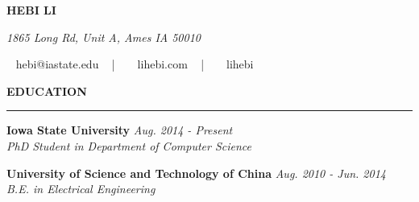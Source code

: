 \documentclass[10pt,letterpaper]{article}
\newenvironment{rSection}[1]{ %
  \sectionskip
  \MakeUppercase{\bf #1} %
  \sectionlineskip
  \hrule %
  \begin{list}{}{ %
      \setlength{\leftmargin}{1.5em} %
    }
  \item[]
}{
  \end{list}
}
\def\namesize{\huge} %
\def\sectionlineskip{\medskip} %
\def\nameskip{\bigskip} %
\def\sectionskip{\medskip} %
\begin{document}
{
  \footnotesize
  \begingroup
  \hfil{\MakeUppercase{\namesize\bf Hebi Li}}\hfil
  \nameskip\break
  \endgroup

  \centerline{\textit{\textcolor{mygray}{1865 Long Rd, Unit A, Ames IA
        50010}}} \centerline{\faEnvelope ~ hebi@iastate.edu ~ | ~
    \faHome ~ lihebi.com ~ | ~ \faGithubSquare ~ lihebi} }

\begin{rSection}{Education}
  \textbf{Iowa State University} \hfill \emph{Aug. 2014 - Present}
  \\ \emph{PhD Student in Department of Computer Science}

  \textbf{University of Science and Technology of China} \hfill
  \emph{Aug. 2010 - Jun. 2014} \\ \emph{B.E. in Electrical Engineering}

\end{rSection}



\end{document}

